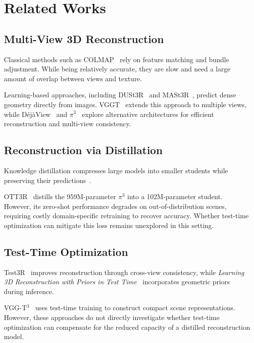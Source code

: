 \section{Related Works}
\label{sec:related}

\subsection{Multi-View 3D Reconstruction}

Classical methods such as COLMAP~\cite{sfm} rely on feature matching and bundle adjustment. While being relatively accurate, they are slow and need a large amount of overlap between views and texture.

Learning-based approaches, including DUSt3R~\cite{dust3r} and MASt3R~\cite{mast3r}, predict dense geometry directly from images. VGGT~\cite{vggt} extends this approach to multiple views, while DéjàView~\cite{dejaview} and $\pi^3$~\cite{pi3} explore alternative architectures for efficient reconstruction and multi-view consistency.

\subsection{Reconstruction via Distillation}

Knowledge distillation compresses large models into smaller students while preserving their predictions~\cite{reconstructiondistillation,surveydistillation}.

OTT3R~\cite{ott3r} distills the 959M-parameter $\pi^3$ into a 102M-parameter student. However, its zero-shot performance degrades on out-of-distribution scenes, requiring costly domain-specific retraining to recover accuracy. Whether test-time optimization can mitigate this loss remains unexplored in this setting.

\subsection{Test-Time Optimization}

Test3R~\cite{test3r} improves reconstruction through cross-view consistency, while \emph{Learning 3D Reconstruction with Priors in Test Time}~\cite{reconstructionpriors} incorporates geometric priors during inference.

VGG-T$^3$~\cite{vggt3} uses test-time training to construct compact scene representations. However, these approaches do not directly investigate whether test-time optimization can compensate for the reduced capacity of a distilled reconstruction model.

